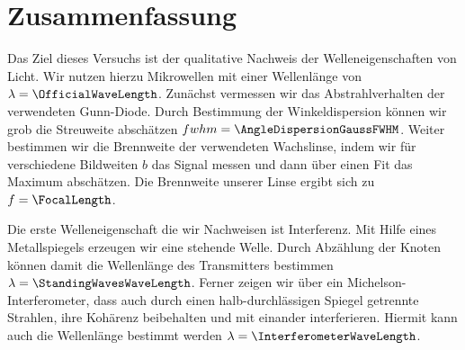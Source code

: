 \documentclass[a4paper,10pt,twocolumn]{article}
\begin{document}
    \section{Zusammenfassung}
    
    
    Das Ziel dieses Versuchs ist der qualitative Nachweis der Welleneigenschaften von Licht.
    Wir nutzen hierzu Mikrowellen mit einer Wellenlänge von $\lambda = \OfficialWaveLength$.
    Zunächst vermessen wir das Abstrahlverhalten der verwendeten Gunn-Diode. 
    Durch Bestimmung der Winkeldispersion können wir grob die Streuweite abschätzen $fwhm = \AngleDispersionGaussFWHM$.
    Weiter bestimmen wir die Brennweite der verwendeten Wachslinse, indem wir für verschiedene
    Bildweiten $b$ das Signal messen und dann über einen Fit das Maximum abschätzen.
    Die Brennweite unserer Linse ergibt sich zu $f = \FocalLength$.
    
    Die erste Welleneigenschaft die wir Nachweisen ist Interferenz.
    Mit Hilfe eines Metallspiegels erzeugen wir eine stehende Welle.
    Durch Abzählung der Knoten können damit die Wellenlänge des Transmitters bestimmen $\lambda = \StandingWavesWaveLength$.
    Ferner zeigen wir über ein Michelson-Interferometer, dass auch durch einen halb-durchlässigen Spiegel getrennte Strahlen,
    ihre Kohärenz beibehalten und mit einander interferieren.
    Hiermit kann auch die Wellenlänge bestimmt werden $\lambda = \InterferometerWaveLength$.
    
\end{document}
